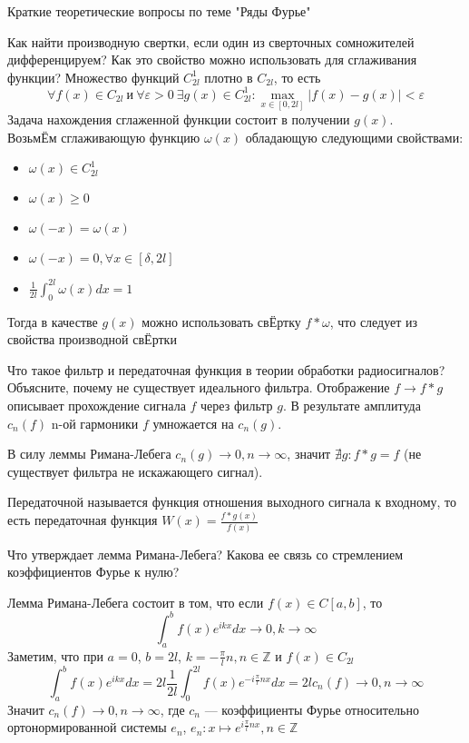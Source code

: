 \documentclass{article}
\begin{document}
\begin{section}{Краткие теоретические вопросы по теме "Ряды Фурье"}
\begin{subsection}{Как найти производную свертки, если один из сверточных сомножителей дифференцируем? Как это свойство можно использовать для сглаживания функции?}
Множество функций $C_{2l}^1$ плотно в $ C_{2l} $, то есть 
\[ \forall f(x) \in C_{2l} \ \text{и} \ \forall \varepsilon > 0 \  \exists g(x) \in C_{2l}^1: \max_{x \in [0, 2l]}|f(x)-g(x)| < \varepsilon\]
Задача нахождения сглаженной функции состоит в получении $g(x)$.\\
Возьм{\footnotesize Ё}м сглаживающую функцию $\omega(x)$ обладающую следующими свойствами:
\begin{itemize}
	\item
	$\omega(x) \in C_{2l}^1$
	\item
	$\omega(x) \geq 0$
	\item
	$ \omega(-x)=\omega(x) $
	\item
	$ \omega(-x)=0, \forall x \in [\delta, 2l] $
	\item
	$\frac{1}{2l}\int_0^{2l}\omega(x)dx = 1$
\end{itemize}
Тогда в качестве $g(x)$ можно использовать св{\footnotesize Ё}ртку $f*\omega$, что следует из свойства производной св{\footnotesize Ё}ртки 
\end{subsection}


\begin{subsection}{Что такое фильтр и передаточная функция в теории обработки радиосигналов? Объясните, почему не существует идеального фильтра.}
Отображение $f \rightarrow f*g$ описывает прохождение сигнала $f$ через фильтр $g$. 
В результате амплитуда $c_n(f)$ n-ой гармоники $f$ умножается на $c_n(g)$.

В силу леммы Римана-Лебега $c_n(g)\rightarrow 0, n\rightarrow \infty$, значит $\nexists g: f*g=f$ (не существует фильтра не искажающего сигнал).

Передаточной называется функция отношения выходного сигнала к входному, то есть передаточная функция $ W(x) = \frac{f*g(x)}{f(x)} $ 
\end{subsection}


\begin{subsection}{Что утверждает лемма Римана-Лебега? Какова ее связь со стремлением коэффициентов Фурье к нулю?}

Лемма Римана-Лебега состоит в том, что если $f(x)\in C[a,b]$, то
\[\int_a^b f(x)e^{ikx}dx \rightarrow 0, k \rightarrow \infty\]
Заметим, что при $a = 0$, $b = 2l$, $k=-\frac{\pi}{l}n, n \in \mathbb{Z}$ и $f(x)\in C_{2l}$ 
\[\int_a^b f(x)e^{ikx}dx = 2l \frac{1}{2l}\int_0^{2l}f(x)e^{-i\frac{\pi}{l}nx}dx = 2lc_n(f) \rightarrow 0, n \rightarrow  \infty\]
Значит $c_n(f) \rightarrow 0, n \rightarrow  \infty$, 
где $c_n$ --- коэффициенты Фурье относительно ортонормированной системы ${e_n}$, $e_n: x \mapsto e^{i\frac{\pi}{l}nx}, n \in \mathbb{Z}$
\end{subsection}



\end{section}
\end{document}
